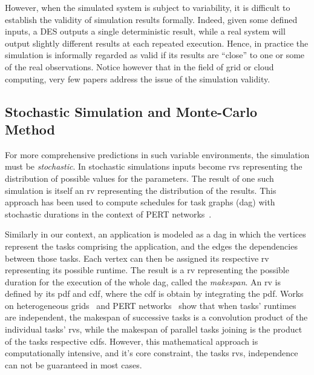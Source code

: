 \documentclass[10pt,conference,compsocconf]{IEEEtran}
\begin{document}
However, when the simulated system is subject to variability, it is difficult
to  establish the  validity of simulation  results formally. Indeed,  given some
defined inputs,  a DES  outputs a  single deterministic  result, while a real
system  will output  slightly different  results at  each repeated  execution.
Hence, in practice  the simulation is informally regarded as
valid if  its results  are ``close'' to  one or some  of the  real observations.
Notice however  that in the  field of grid or  cloud computing, very  few papers
address the issue of the simulation validity.

\subsection{Stochastic Simulation and Monte-Carlo Method}

\label{sc:relwork-stochastic}
For  more   comprehensive  predictions  in  such   variable  environments,  the
simulation must  be \emph{stochastic}.  In stochastic simulations  inputs become
\acfp{rv} representing the  distribution of possible values  for the parameters.
The  result  of one  such  simulation  is  itself  an \ac{rv}  representing  the
distribution  of the  results.  This  approach has  been used to  compute
schedules for task graphs (\ac{dag}) with stochastic durations in the context of
PERT networks~\cite{Slyke63}.


Similarly in  our context,  an application is modeled  as a  \ac{dag} in
which the vertices represent the tasks  comprising the application, and the edges
the dependencies between those tasks.  Each vertex can then be assigned its respective
\ac{rv}  representing   its  possible  runtime.    The  result  is   a  \ac{rv}
representing  the possible  duration for  the execution  of the  whole \ac{dag},
called the \emph{makespan}. An \ac{rv} is  defined by its \ac{pdf}  and \ac{cdf},
where  the   \ac{cdf}  is  obtain   by  integrating  the  \ac{pdf}.    Works  on
heterogeneous  grids~\cite{Li97} and  PERT  networks~\cite{Ludwig01} show  that
when  tasks' runtimes  are  independent, the  makespan of  successive  tasks is  a
convolution product  of the individual  tasks' \acp{rv}, while the  makespan of
parallel tasks  joining is the  product of  the tasks respective  \acp{cdf}. However, this
mathematical approach is computationally intensive, and it's core constraint,
the tasks \acp{rv}, independence can not be guaranteed in most cases.
\end{document}
